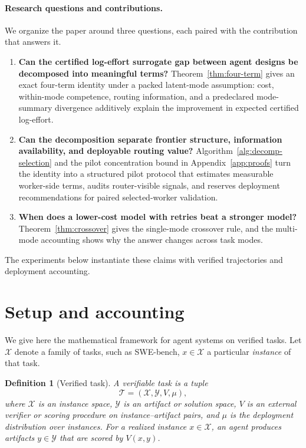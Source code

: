 \documentclass{article}
\newtheorem{definition}{Definition}
\begin{document}
\paragraph{Research questions and contributions.}
We organize the paper around three questions, each paired with the contribution that answers it.

\begin{enumerate}[leftmargin=1.4em,itemsep=0.15em]
  \item \textbf{Can the certified log-effort surrogate gap between agent designs be decomposed into meaningful terms?}
  Theorem~\ref{thm:four-term} gives an exact four-term identity under a packed latent-mode assumption: cost, within-mode competence, routing information, and a predeclared mode-summary divergence additively explain the improvement in expected certified log-effort.
  \item \textbf{Can the decomposition separate frontier structure, information availability, and deployable routing value?}
  Algorithm~\ref{alg:decomp-selection} and the pilot concentration bound in Appendix~\ref{app:proofs} turn the identity into a structured pilot protocol that estimates measurable worker-side terms, audits router-visible signals, and reserves deployment recommendations for paired selected-worker validation.
  \item \textbf{When does a lower-cost model with retries beat a stronger model?}
  Theorem~\ref{thm:crossover} gives the single-mode crossover rule, and the multi-mode accounting shows why the answer changes across task modes.
\end{enumerate}

The experiments below instantiate these claims with verified trajectories and deployment accounting.

\section{Setup and accounting}
\label{sec:framework}

We give here the mathematical framework for agent systems on verified tasks. Let \(\mathcal X\) denote a family of tasks, such as
SWE-bench, \(x\in\mathcal X\) a particular \textit{instance} of that task.

\begin{definition}[Verified task]
\label{def:verified-task}
A verifiable task is a tuple
\[
\mathcal T=(\mathcal X,\mathcal Y,V,\mu),
\]
where $\mathcal X$ is an instance space, $\mathcal Y$ is an artifact or solution space,
$V$ is an external verifier or scoring procedure on instance--artifact pairs, and
$\mu$ is the deployment distribution over instances.
For a realized instance $x\in\mathcal X$, an agent produces artifacts $y\in\mathcal Y$ that are scored by $V(x,y)$.
\end{definition}
\end{document}
